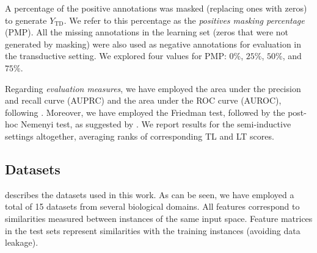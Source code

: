 \documentclass[letterpaper]{article}
\begin{document}
A percentage of the positive annotations was masked (replacing ones with zeros) to generate $Y_\text{TD}$.
We refer to this percentage as the \emph{positives masking percentage} (PMP).
All the missing annotations in the learning set (zeros that were not generated by masking) were also used as negative annotations for evaluation in the transductive setting. We explored four values for PMP: $0\%$, $25\%$, $50\%$, and $75\%$.


Regarding \emph{evaluation measures}, we have employed the area under the precision and recall curve (AUPRC) and the area under the ROC curve (AUROC), following  \citet{schrynemackers_protocols_2013,pliakos_global_2018,pliakos_drug-target_2020,liu_drug-target_2022}. 
%
Moreover, we have employed the Friedman test, followed by the post-hoc Nemenyi test, as suggested by \citet{demsar_statistical_2006}.
%
We report results for the semi-inductive settings altogether, averaging ranks of corresponding TL and LT scores.


\subsection{Datasets}
\label{sec:datasets}

 describes the datasets used in this work.
As can be seen, we have employed a total of 15 datasets from several biological domains.
All features correspond to similarities measured between instances of the same input space.
Feature matrices in the test sets represent similarities with the training instances (avoiding data leakage).
\end{document}
